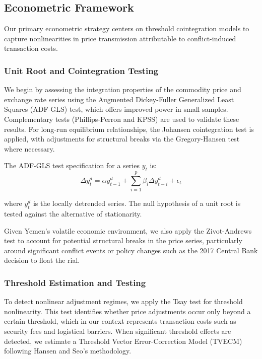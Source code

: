 \subsection{Econometric Framework}

Our primary econometric strategy centers on threshold cointegration models to capture nonlinearities in price transmission attributable to conflict-induced transaction costs.

\subsubsection{Unit Root and Cointegration Testing}

We begin by assessing the integration properties of the commodity price and exchange rate series using the Augmented Dickey-Fuller Generalized Least Squares (ADF-GLS) test, which offers improved power in small samples.\autocite{elliott1996} Complementary tests (Phillips-Perron and KPSS) are used to validate these results. For long-run equilibrium relationships, the Johansen cointegration test is applied, with adjustments for structural breaks via the Gregory-Hansen test where necessary.\autocite{gregory1996}

The ADF-GLS test specification for a series $y_t$ is:
\begin{equation}
\Delta y_t^d = \alpha y_{t-1}^d + \sum_{i=1}^p \beta_i \Delta y_{t-i}^d + \epsilon_t
\end{equation}

where $y_t^d$ is the locally detrended series. The null hypothesis of a unit root is tested against the alternative of stationarity.

Given Yemen's volatile economic environment, we also apply the Zivot-Andrews test to account for potential structural breaks in the price series, particularly around significant conflict events or policy changes such as the 2017 Central Bank decision to float the rial.\autocite{zivot1992}

\subsubsection{Threshold Estimation and Testing}

To detect nonlinear adjustment regimes, we apply the Tsay test for threshold nonlinearity.\autocite{tsay1989} This test identifies whether price adjustments occur only beyond a certain threshold, which in our context represents transaction costs such as security fees and logistical barriers. When significant threshold effects are detected, we estimate a Threshold Vector Error-Correction Model (TVECM) following Hansen and Seo's methodology.\autocite{hansen2002}

